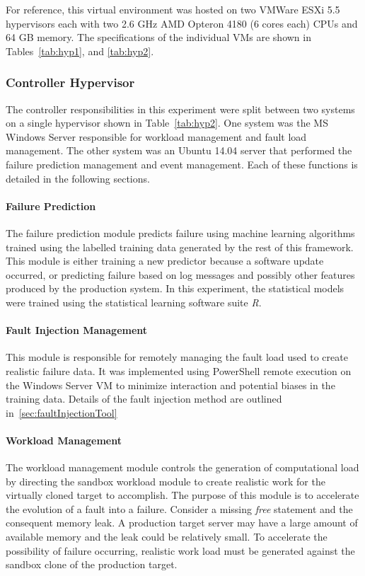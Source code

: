 For reference, this virtual environment was
hosted on two VMWare ESXi 5.5 hypervisors each with two 2.6 \ac{GHz} AMD
Opteron 4180 (6 cores each) \ac{CPU}s and 64 \ac{GB} memory.  The
specifications of the individual \ac{VM}s are shown in Tables~\ref{tab:hyp1},
and \ref{tab:hyp2}.

\tabHypervisorOne
\tabHypervisorTwo

\setcounter{secnumdepth}{5}

\subsubsection{Controller Hypervisor} \label{sec:controller} %
The controller responsibilities in this experiment were split between two
systems on a single hypervisor shown in Table~\ref{tab:hyp2}.  One system was
the \ac{MS} Windows Server responsible for workload management and fault load
management.  The other system was an Ubuntu 14.04 server that performed the
failure prediction management and event management.  Each of these functions is
detailed in the following sections.

\paragraph{Failure Prediction} \label{sec:failurePrediction} %
The failure prediction module predicts failure using machine learning
algorithms trained using the labelled training data generated by the rest of
this framework.  This module is either training a new predictor
because a software update occurred, or predicting failure based on log messages
and possibly other features produced by the production system.  In this
experiment, the statistical models were trained using the statistical
learning software suite \emph{R}.

\paragraph{Fault Injection Management} \label{sec:faultInjectionMgr}
This module is responsible for remotely managing the fault load used to create
realistic failure data.  It was implemented using PowerShell remote execution
on the Windows Server \ac{VM} to minimize interaction and potential biases in
the training data.  Details of the fault injection method are outlined
in~\ref{sec:faultInjectionTool}

\paragraph{Workload Management} \label{sec:workloadMgr} 
The workload management module controls the generation of computational load by
directing the sandbox workload module to create realistic work for the
virtually cloned target to accomplish.  The purpose of this module is to
accelerate the evolution of a fault into a failure.  Consider a missing
\emph{free} statement and the consequent memory leak.  A production target
server may have a large amount of available memory and the leak could be
relatively small.  To accelerate the possibility of failure occurring,
realistic work load must be generated against the sandbox clone of the
production target.

